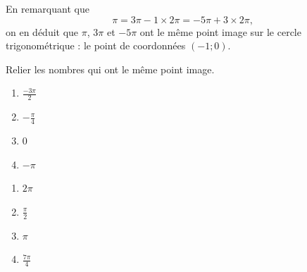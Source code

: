 \documentclass[11pt]{article}
\begin{document}
\begin{exemple}
  En remarquant que
  \[
    \pi = 3\pi-1\times2\pi = -5\pi+3\times2\pi,
  \]
  on en déduit que $\pi$, $3\pi$ et $-5\pi$ ont le même point image sur le
  cercle trigonométrique : le point de coordonnées $(-1;0)$.
\end{exemple}

\begin{app}
  Relier les nombres qui ont le même point image.\\
  \begin{minipage}{.5\textwidth}
    \begin{center}
      \begin{enumerate}[label=(\arabic*)]
        \item $\frac{-3\pi}{2}$
        \item $-\frac{\pi}{4}$
        \item $0$
        \item $-\pi$
      \end{enumerate}
    \end{center}
  \end{minipage}
  \begin{minipage}{.5\textwidth}
    \begin{center}
      \begin{enumerate}[label=(\alph*)]
        \item $2\pi$
        \item $\frac{\pi}{2}$
        \item $\pi$
        \item $\frac{7\pi}{4}$
      \end{enumerate}
    \end{center}
  \end{minipage}
\end{app}
\end{document}
